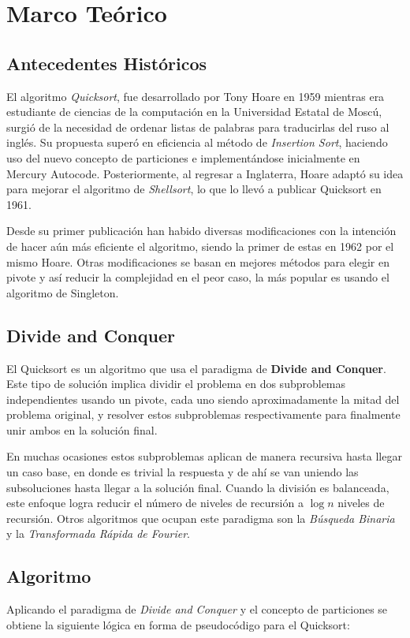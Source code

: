 \documentclass[conference]{IEEEtran}
\begin{document}
\section{Marco Teórico}
\subsection{Antecedentes Históricos}
El algoritmo \textit{Quicksort}, fue desarrollado por Tony Hoare en 1959 mientras era estudiante de ciencias de la computación en la Universidad Estatal de Moscú, 
surgió de la necesidad de ordenar listas de palabras para traducirlas del ruso al inglés. 
Su propuesta superó en eficiencia al método de \textit{Insertion Sort}, haciendo uso del nuevo concepto de particiones e implementándose inicialmente en Mercury Autocode. 
Posteriormente, al regresar a Inglaterra, Hoare adaptó su idea para mejorar el algoritmo de \textit{Shellsort}, lo que lo llevó a publicar Quicksort en 1961.\cite{original_paper}
\par
Desde su primer publicación han habido diversas modificaciones con la intención de hacer aún más eficiente el algoritmo, siendo la primer de estas en 1962 por el mismo Hoare.
Otras modificaciones se basan en mejores métodos para elegir en pivote y así reducir la complejidad en el peor caso, la más popular es usando el algoritmo de Singleton.\cite{history} 

\subsection{Divide and Conquer}
El Quicksort es un algoritmo que usa el paradigma de \textbf{Divide and Conquer}. 
Este tipo de solución implica dividir el problema en dos subproblemas independientes usando un pivote, 
cada uno siendo aproximadamente la mitad del problema original, y resolver estos subproblemas respectivamente para finalmente unir ambos en la solución final.\par
En muchas ocasiones estos subproblemas aplican de manera recursiva hasta llegar un caso base, en donde es trivial la respuesta y de ahí se van uniendo las subsoluciones hasta llegar a la solución final.
Cuando la división es balanceada, este enfoque logra reducir el número de niveles de recursión a $\log{n}$ niveles de recursión.
Otros algoritmos que ocupan este paradigma son la \textit{Búsqueda Binaria} y la \textit{Transformada Rápida de Fourier}.\cite{divide_and_conquer}


\subsection{Algoritmo}
Aplicando el paradigma de \textit{Divide and Conquer} y el concepto de particiones se obtiene la siguiente lógica en forma de pseudocódigo para el Quicksort\cite{Grokking}:
\end{document}

